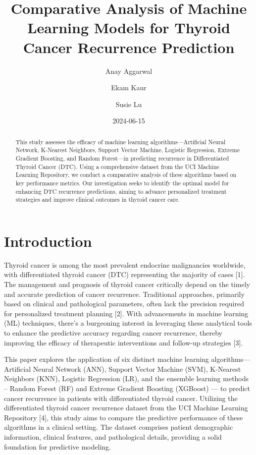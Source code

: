 \documentclass[
  letterpaper,
  DIV=11,
  numbers=noendperiod]{scrartcl}
\title{Comparative Analysis of Machine Learning Models for Thyroid
Cancer Recurrence Prediction}
\author{Anay Aggarwal \and Ekam Kaur \and Susie Lu}
\date{2024-06-15}
\begin{document}
\maketitle
\begin{abstract}
This study assesses the efficacy of machine learning
algorithms---Artificial Neural Network, K-Nearest Neighbors, Support
Vector Machine, Logistic Regression, Extreme Gradient Boosting, and
Random Forest---in predicting recurrence in Differentiated Thyroid
Cancer (DTC). Using a comprehensive dataset from the UCI Machine
Learning Repository, we conduct a comparative analysis of these
algorithms based on key performance metrics. Our investigation seeks to
identify the optimal model for enhancing DTC recurrence predictions,
aiming to advance personalized treatment strategies and improve clinical
outcomes in thyroid cancer care.
\end{abstract}

\section{Introduction}\label{introduction}

Thyroid cancer is among the most prevalent endocrine malignancies
worldwide, with differentiated thyroid cancer (DTC) representing the
majority of cases {[}1{]}. The management and prognosis of thyroid
cancer critically depend on the timely and accurate prediction of cancer
recurrence. Traditional approaches, primarily based on clinical and
pathological parameters, often lack the precision required for
personalized treatment planning {[}2{]}. With advancements in machine
learning (ML) techniques, there's a burgeoning interest in leveraging
these analytical tools to enhance the predictive accuracy regarding
cancer recurrence, thereby improving the efficacy of therapeutic
interventions and follow-up strategies {[}3{]}.

This paper explores the application of six distinct machine learning
algorithms---Artificial Neural Network (ANN), Support Vector Machine
(SVM), K-Nearest Neighbors (KNN), Logistic Regression (LR), and the
ensemble learning methods -- Random Forest (RF) and Extreme Gradient
Boosting (XGBoost) --- to predict cancer recurrence in patients with
differentiated thyroid cancer. Utilizing the differentiated thyroid
cancer recurrence dataset from the UCI Machine Learning Repository
{[}4{]}, this study aims to compare the predictive performance of these
algorithms in a clinical setting. The dataset comprises patient
demographic information, clinical features, and pathological details,
providing a solid foundation for predictive modeling.
\end{document}
